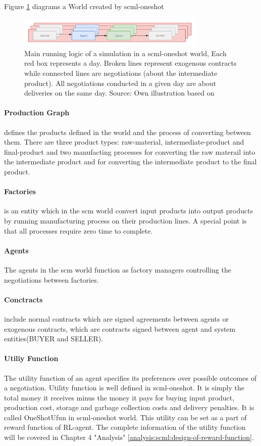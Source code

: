 Figure \ref{fig:overview-scml-oneshot} diagrams a World created by \gls{scml-oneshot}

\begin{figure}[htbp]
\centering
\includegraphics[width=0.8\textwidth]{./images/overview-scml-oneshot.png}
\caption{Main running logic of a simulation in a \gls{scml-oneshot} world, Each red box represents a day. Broken lines represent exogenous contracts while connected lines are negotiations (about the intermediate product). All negotiations conducted in a given day are about deliveries on the same day. Source: Own illustration based on\parencite{Mohammad2021}}
\label{fig:overview-scml-oneshot}
\end{figure}

\paragraph{Production Graph} defines the products defined in the world and the process of converting between them. There are three product types: raw-material, intermediate-product and final-product and two manufacting processes for converting the raw materail into the intermediate product and for converting the intermediate product to the final product.
\paragraph{Factories} is an entity which in the \gls{scm} world convert input products into output products by running manufacturing process on their production lines. A special point is that all processes require zero time to complete.
\paragraph{Agents} The agents in the \gls{scm} world function as factory managers controlling the negotiations between factories.
\paragraph{Conctracts} include normal contracts which are signed agreements between agents or exogenous contracts, which are contracts signed between agent and system entities(BUYER and SELLER).
\paragraph{Utiliy Function} The utility function of an agent specifies its preferences over possible outcomes of a negotiation. Utility function is well defined in \gls{scml-oneshot}. It is simply the total money it receives minus the money it pays for buying input product, production cost, storage and garbage collection costs and delivery penalties. It is called OneShotUfun in \gls{scml-oneshot} world. This utility can be set as a part of reward function of RL-agent. The complete information of the utility function will be covered in Chapter 4 "Analysis" \ref{analysis:scml:design-of-reward-function}.
